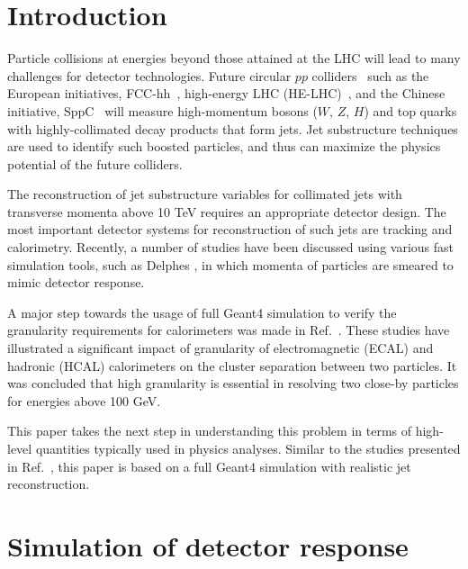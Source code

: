 \documentclass[final,1p,11pt]{elsarticle}
\begin{document}
\section{Introduction}
Particle collisions at energies  beyond those attained at the LHC will lead to many challenges for detector technologies.
Future circular $pp$ colliders~\cite{Mangano:2018mur} such as the European initiatives, FCC-hh~\cite{Benedikt:2018csr}, high-energy LHC (HE-LHC)~\cite{Zimmermann:2018wdi}, and the Chinese initiative, SppC~\cite{Tang:2015qga} will measure high-momentum bosons ($W$, $Z$, $H$) and top quarks with highly-collimated decay products that form jets. 
Jet substructure techniques are used
to identify such boosted particles, and thus can maximize the physics potential of the future colliders.

The reconstruction of jet substructure  variables for collimated jets with transverse momenta above 10 TeV 
requires an appropriate detector design. The most important detector systems for reconstruction of such jets are tracking and calorimetry.
Recently, a number of studies \cite{Calkins:2013ega,Chekanov:2015ihl,Coleman:2017fiq} 
have been discussed using various fast simulation tools, such as 
Delphes  \cite{deFavereau:2013fsa}, in which momenta of particles
are smeared to mimic detector response. 

A major step towards the usage of full Geant4 simulation to verify the granularity requirements 
for calorimeters was made in Ref.~\cite{Chekanov:2016ppq}.
These studies have illustrated a significant impact 
of granularity of electromagnetic (ECAL) and hadronic (HCAL) calorimeters on the
cluster separation between two particles. It was concluded that high granularity is essential 
in resolving two close-by particles for energies above 100 GeV. 

This paper takes the next step in understanding this problem in terms of high-level quantities typically used in physics analyses. Similar to the studies presented in Ref.~\cite{Chekanov:2016ppq}, this paper is based on a full
Geant4 simulation with realistic jet reconstruction.

\section{Simulation of detector response}
\label{sec:sim}
\end{document}
